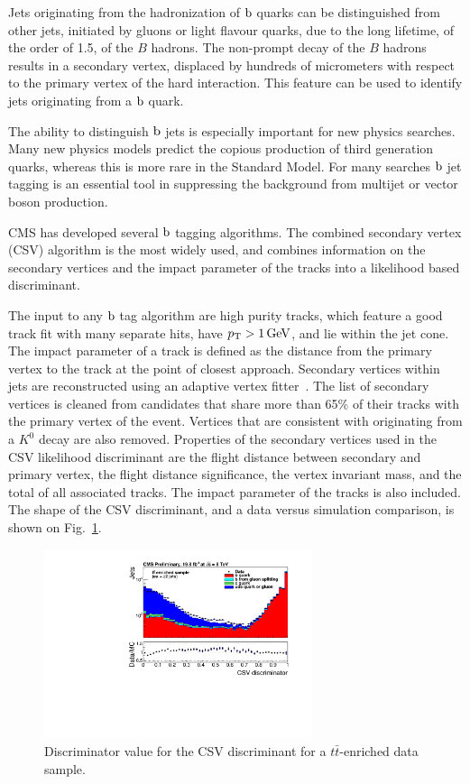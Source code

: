 Jets originating from the hadronization of $\mathrm{b}$ quarks can be distinguished from other jets,
initiated by gluons or light flavour quarks, due to the long lifetime, of the order of
1.5\second, of the $B$ hadrons. 
The non-prompt decay of the $B$ hadrons results in a secondary vertex, displaced by hundreds of
micrometers with respect to the primary vertex of the hard interaction. This feature can be used to
identify jets originating from a $\mathrm{b}$ quark. 

The ability to distinguish $\mathrm{b}$ jets is especially important for new physics searches. Many new
physics models predict the copious production of third generation quarks, whereas this is more rare
in the Standard Model. For many searches $\mathrm{b}$ jet tagging is an essential tool in suppressing
the background from multijet or vector boson production. 

CMS has developed several $\mathrm{b}$ tagging algorithms\cite{btag7TeV,btag8TeV}. The combined
secondary vertex (CSV) algorithm is the most widely used, and combines information on the secondary
vertices and the impact parameter of the tracks into a likelihood based discriminant. 
 
The input to any $\mathrm{b}$ tag algorithm are high purity tracks, which feature a good track fit with
many separate hits, have $p_{\mathrm{T}} > 1\,\text{Ge\hspace{-.08em}V}$, and lie within the jet cone. 
The impact parameter of a track is defined as the distance from the primary vertex to the track at
the point of closest approach.  
Secondary vertices within jets are reconstructed using an adaptive vertex
fitter~\cite{Fruhwirth:2007hz}. The list of secondary vertices is cleaned from candidates that
share more than 65\% of their tracks with the primary vertex of the event. Vertices that are
consistent with originating from a $K^0$ decay are also removed. Properties of the secondary
vertices used in the CSV likelihood discriminant are the flight distance between secondary and
primary vertex, the flight distance significance, the vertex invariant mass, and the total \pt of
all associated tracks. The impact parameter of the tracks is also included. The shape of the CSV
discriminant, and a data versus simulation comparison, is shown on Fig.~\ref{fig:CSV_discriminant}.

\begin{figure}[h]
  \centering
  \includegraphics[width=0.7\textwidth]{figures/eventreco_objects/CSV_Log_ttbar}
  \caption{ Discriminator value for the CSV discriminant for a $t\bar{t}$-enriched data sample.
  \label{fig:CSV_discriminant}}
\end{figure}

